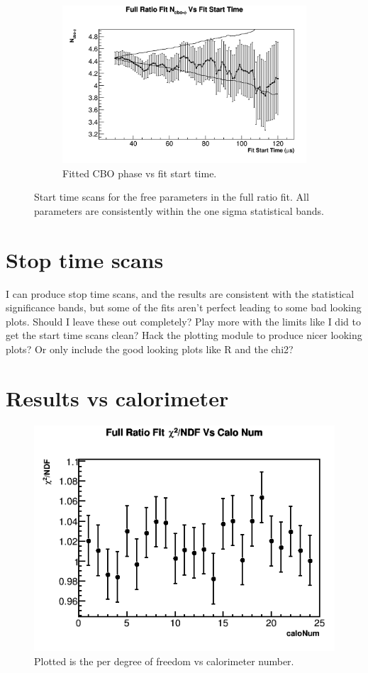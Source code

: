 \begin{figure}[]
\begin{subfigure}[t]{0.45\textwidth}
		\includegraphics[width=\textwidth]{RatioCBO_N_cbo-phi_FS_Canv}
	    \caption{Fitted CBO phase vs fit start time.}
    \end{subfigure}%
\caption[FitStartScans]{Start time scans for the free parameters in the full ratio fit. All parameters are consistently within the one sigma statistical bands.}
\label{fig:FitStartScans}
\end{figure}

\section{Stop time scans}

I can produce stop time scans, and the results are consistent with the statistical significance bands, but some of the fits aren't perfect leading to some bad looking plots. Should I leave these out completely? Play more with the limits like I did to get the start time scans clean? Hack the plotting module to produce nicer looking plots? Or only include the good looking plots like R and the chi2?


\section{Results vs calorimeter}

\begin{figure}[H]
	\centering
	\includegraphics[width=.7\textwidth]{RatioCBOFit_Chi2NDF_Vs_Calo_Canv}
    \caption[RatioCBOFit_Chi2NDF_Vs_Calo_Canv]{Plotted is the \chisq per degree of freedom vs calorimeter number.}
    \label{fig:RatioCBOFit_Chi2NDF_Vs_Calo_Canv}
\end{figure}


